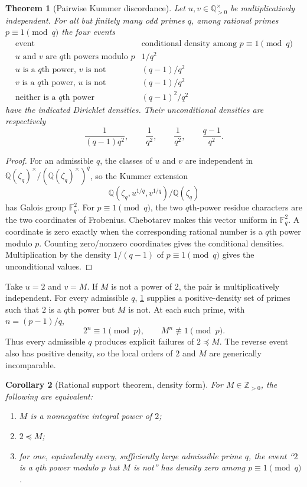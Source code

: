 \documentclass[11pt]{article}
\newtheorem{theorem}{Theorem}[section]
\newtheorem{corollary}[theorem]{Corollary}
\theoremstyle{definition}
\theoremstyle{remark}
\newcommand{\Q}{\mathbb{Q}}
\newcommand{\Z}{\mathbb{Z}}
\newcommand{\F}{\mathbb{F}}
\begin{document}
\begin{theorem}[Pairwise Kummer discordance]\label{thm:pairdiscord}
Let $u,v\in\Q_{>0}^{\times}$ be multiplicatively independent.  For all but finitely many odd
primes $q$, among rational primes $p\equiv1\pmod q$ the four events
\[
\begin{array}{c|c}
\text{event}&\text{conditional density among }p\equiv1\pmod q\\ \hline
u\text{ and }v\text{ are }q\text{th powers modulo }p&1/q^2\\
u\text{ is a }q\text{th power, }v\text{ is not}&(q-1)/q^2\\
v\text{ is a }q\text{th power, }u\text{ is not}&(q-1)/q^2\\
\text{neither is a }q\text{th power}&(q-1)^2/q^2
\end{array}
\]
have the indicated Dirichlet densities.  Their unconditional densities are respectively
\[
 \frac1{(q-1)q^2},\qquad \frac1{q^2},\qquad\frac1{q^2},\qquad\frac{q-1}{q^2}.
\]
\end{theorem}
\begin{proof}
For an admissible $q$, the classes of $u$ and $v$ are independent in
$\Q(\zeta_q)^\times/(\Q(\zeta_q)^\times)^q$, so the Kummer extension
\[
   \Q(\zeta_q,u^{1/q},v^{1/q})/\Q(\zeta_q)
\]
has Galois group $\F_q^2$.  For $p\equiv1\pmod q$, the two $q$th-power residue characters are
the two coordinates of Frobenius.  Chebotarev makes this vector uniform in $\F_q^2$.  A
coordinate is zero exactly when the corresponding rational number is a $q$th power modulo
$p$.  Counting zero/nonzero coordinates gives the conditional densities.  Multiplication by
the density $1/(q-1)$ of $p\equiv1\pmod q$ gives the unconditional values.
\end{proof}

Take $u=2$ and $v=M$.  If $M$ is not a power of $2$, the pair is multiplicatively independent.
For every admissible $q$, \cref{thm:pairdiscord} supplies a positive-density set of primes such
that $2$ is a $q$th power but $M$ is not.  At each such prime, with
$n=(p-1)/q$,
\[
        2^n\equiv1\pmod p,
        \qquad
        M^n\not\equiv1\pmod p.
\]
Thus every admissible $q$ produces explicit failures of $2\preccurlyeq M$.  The reverse event
also has positive density, so the local orders of $2$ and $M$ are generically incomparable.

\begin{corollary}[Rational support theorem, density form]\label{cor:densitysupport}
For $M\in\Z_{>0}$, the following are equivalent:
\begin{enumerate}[label=(\roman*),leftmargin=2em]
\item $M$ is a nonnegative integral power of $2$;
\item $2\preccurlyeq M$;
\item for one, equivalently every, sufficiently large admissible prime $q$, the event
      ``$2$ is a $q$th power modulo $p$ but $M$ is not'' has density zero among
      $p\equiv1\pmod q$.
\end{enumerate}
\end{corollary}
\end{document}
